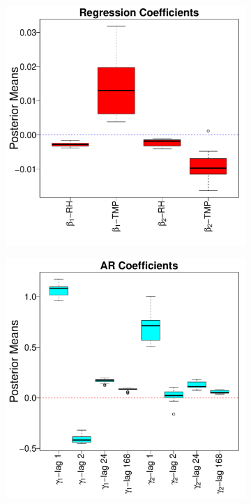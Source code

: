 \documentclass[alpha-refs]{wiley-article}
\begin{document}
\begin{figure}[H]
  \begin{center}
   \begin{subfigure}[b]{.35\textwidth}
      \includegraphics[width=\textwidth]{betas}
   \end{subfigure}
     \begin{subfigure}[b]{.35\textwidth}
     \includegraphics[width=\textwidth]{gammas}

\end{subfigure}
\end{center}
\end{figure}
\end{document}
